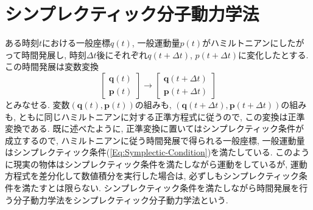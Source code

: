\section{シンプレクティック分子動力学法}
ある時刻$t$における一般座標$q(t)$, 一般運動量$p(t)$がハミルトニアンにしたがって時間発展し, 時刻$\Delta t$後にそれぞれ$q(t + \Delta t)$, $p(t + \Delta t)$に変化したとする. この時間発展は変数変換
\begin{equation}
  \begin{bmatrix}
    \bm{q}(t) \\
    \bm{p}(t)
  \end{bmatrix}
  \to
  \begin{bmatrix}
    \bm{q}(t + \Delta t) \\
    \bm{p}(t + \Delta t)
  \end{bmatrix}
\end{equation}
とみなせる. 
変数$(\bm{q}(t),\bm{p}(t))$の組みも, $(\bm{q}(t + \Delta t),\bm{p}(t + \Delta t))$の組みも, ともに同じハミルトニアンに対する正準方程式に従うので, この変換は正準変換である. 既に述べたように, 正準変換に置いてはシンプレクティック条件が成立するので, ハミルトニアンに従う時間発展で得られる一般座標, 一般運動量はシンプレクティック条件(\ref{Eq:Symplectic-Condition})を満たしている. 
このように現実の物体はシンプレクティック条件を満たしながら運動をしているが, 運動方程式を差分化して数値積分を実行した場合は, 必ずしもシンプレクティック条件を満たすとは限らない. 
シンプレクティック条件を満たしながら時間発展を行う分子動力学法をシンプレクティック分子動力学法という. 

